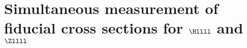 \section{Simultaneous measurement of fiducial cross sections for \texorpdfstring{$\Hllll$}{H to 4l} and \texorpdfstring{$\Zllll$}{Z to 4l}}

%


